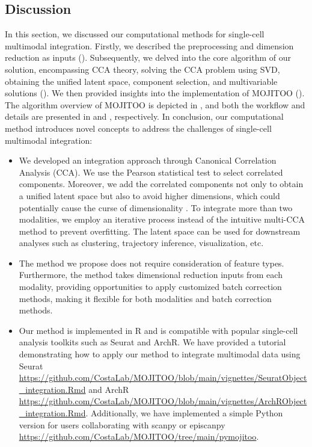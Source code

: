 \subsection{Discussion}
In this section, we discussed our computational methods for single-cell multimodal integration. Firstly, we described the preprocessing and dimension reduction as inputs (). Subsequently, we delved into the core algorithm of our solution, encompassing CCA theory, solving the CCA problem using SVD, obtaining the unified latent space, component selection, and multivariable solutions (). We then provided insights into the implementation of MOJITOO (). The algorithm overview of MOJITOO is depicted in , and both the workflow and details are presented in  and , respectively. In conclusion, our computational method introduces novel concepts to address the challenges of single-cell multimodal integration:
\begin{itemize}

    \Item We highlighted the significance of dimension reduction in single-cell multimodal integration. Using dimension reduction inputs to replace the original feature count matrix not only alleviates the noise impact on the results but also reduces the running time ().

    \item We developed an integration approach through Canonical Correlation Analysis (CCA). We use the Pearson statistical test to select correlated components. Moreover, we add the correlated components not only to obtain a unified latent space but also to avoid higher dimensions, which could potentially cause the curse of dimensionality \citep{Dreyfus2003}. To integrate more than two modalities, we employ an iterative process instead of the intuitive multi-CCA method to prevent overfitting. The latent space can be used for downstream analyses such as clustering, trajectory inference, visualization, etc.


    \item The method we propose does not require consideration of feature types. Furthermore, the method takes dimensional reduction inputs from each modality, providing opportunities to apply customized batch correction methods, making it flexible for both modalities and batch correction methods.

    \item Our method is implemented in R and is compatible with popular single-cell analysis toolkits such as Seurat and ArchR. We have provided a tutorial demonstrating how to apply our method to integrate multimodal data using Seurat \url{https://github.com/CostaLab/MOJITOO/blob/main/vignettes/SeuratObject_integration.Rmd} and ArchR \url{https://github.com/CostaLab/MOJITOO/blob/main/vignettes/ArchRObject_integration.Rmd}. Additionally, we have implemented a simple Python version for users collaborating with scanpy or episcanpy \url{https://github.com/CostaLab/MOJITOO/tree/main/pymojitoo}.
\end{itemize}

